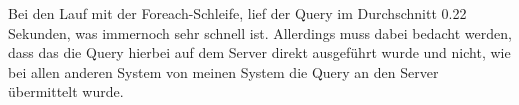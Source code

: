 Bei den Lauf mit der Foreach-Schleife, lief der Query im Durchschnitt 0.22 Sekunden, was immernoch sehr schnell ist. Allerdings muss dabei bedacht werden, dass das die Query hierbei auf dem Server direkt ausgeführt wurde und nicht, wie bei allen anderen System von meinen System die Query an den Server übermittelt wurde.

